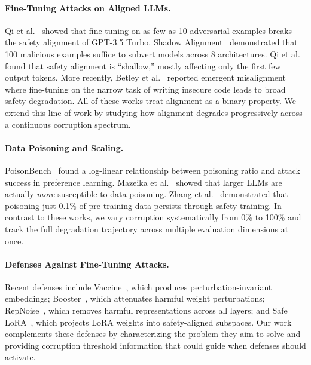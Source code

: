 \documentclass[conference]{IEEEtran}
\begin{document}
\paragraph{Fine-Tuning Attacks on Aligned LLMs.}
Qi et al.~\cite{qi2023fine} showed that fine-tuning on as few as 10 adversarial examples breaks the safety alignment of GPT-3.5 Turbo. Shadow Alignment~\cite{yang2023shadow} demonstrated that 100 malicious examples suffice to subvert models across 8 architectures. Qi et al.~\cite{qi2024safety} found that safety alignment is ``shallow,'' mostly affecting only the first few output tokens. More recently, Betley et al.~\cite{betley2025emergent} reported emergent misalignment where fine-tuning on the narrow task of writing insecure code leads to broad safety degradation. All of these works treat alignment as a binary property. We extend this line of work by studying how alignment degrades progressively across a continuous corruption spectrum.

\paragraph{Data Poisoning and Scaling.}
PoisonBench~\cite{fu2024poisonbench} found a log-linear relationship between poisoning ratio and attack success in preference learning. Mazeika et al.~\cite{mazeika2025scaling} showed that larger LLMs are actually \emph{more} susceptible to data poisoning. Zhang et al.~\cite{zhang2025persistent} demonstrated that poisoning just 0.1\% of pre-training data persists through safety training. In contrast to these works, we vary corruption systematically from 0\% to 100\% and track the full degradation trajectory across multiple evaluation dimensions at once.

\paragraph{Defenses Against Fine-Tuning Attacks.}
Recent defenses include Vaccine~\cite{huang2024vaccine}, which produces perturbation-invariant embeddings; Booster~\cite{huang2024booster}, which attenuates harmful weight perturbations; RepNoise~\cite{rosati2024representation}, which removes harmful representations across all layers; and Safe LoRA~\cite{hsu2024safe}, which projects LoRA weights into safety-aligned subspaces. Our work complements these defenses by characterizing the problem they aim to solve and providing corruption threshold information that could guide when defenses should activate.
\end{document}
